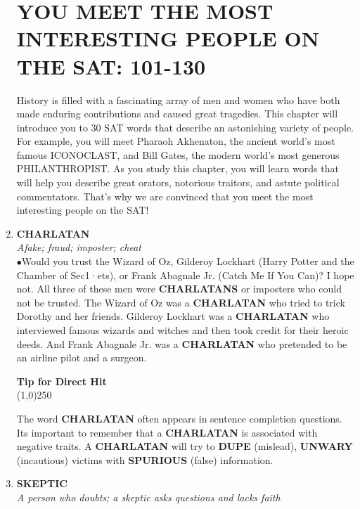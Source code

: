 \documentclass{book}
\begin{document}
\begin{enumerate}
\chapter{YOU MEET THE MOST INTERESTING
PEOPLE ON THE SAT: 101-130}

History is filled with a fascinating array of men and women who have both made enduring contributions and caused great tragedies. This chapter will introduce you to 30 SAT words that describe an astonishing variety of people. For example, you will meet Pharaoh Akhenaton, the ancient world's most famous ICONOCLAST, and Bill Gates, the modern world's most generous PHILANTHROPIST. As you study this chapter, you will learn words that will help you describe great orators, notorious traitors, and astute political commentators. That's why we are convinced that you meet the most interesting people on the SAT!

\item  \textbf{CHARLATAN}\\
\textit{Afake; fraud; imposter; cheat}\\

$ \bullet $Would you trust the Wizard of Oz, Gilderoy Lockhart (Harry Potter and the Chamber of Sec1·ets), or Frank Abagnale Jr. (Catch Me If You Can)? I hope not. All
three of these men were \textbf{CHARLATANS} or imposters who could not be trusted. The Wizard of Oz was a \textbf{CHARLATAN} who tried to trick Dorothy and her friends. Gilderoy Lockhart was a \textbf{CHARLATAN} who interviewed famous wizards and witches and then took credit for their heroic deeds. And Frank Abagnale Jr. was a \textbf{CHARLATAN} who pretended to be an airline pilot and a surgeon.

\begin{tcolorbox}
\begin{center}
\textbf{Tip for Direct Hit}\\
\line(1,0){250}\\
\end{center}
The word \textbf{CHARLATAN} often appears in sentence completion questions. Its important to remember that a \textbf{CHARLATAN} is associated with negative traits. A \textbf{CHARLATAN} will try to \textbf{DUPE} (mislead), \textbf{UNWARY} (incautious) victims with \textbf{SPURIOUS} (false) information.
\end{tcolorbox}

\item  \textbf{SKEPTIC}\\
\textit{A person who doubts; a skeptic asks questions
and lacks faith}


\end{enumerate}
\end{document}
